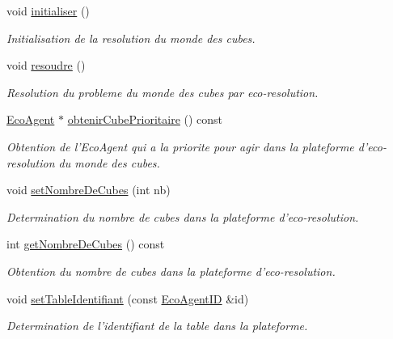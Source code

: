 \begin{CompactItemize}
\item 
void \hyperlink{classPlateformeMondeDesCubes_67160be6f5ecd0b8f3fffeb1a7bd81ba}{initialiser} ()
\begin{CompactList}\small\item\em Initialisation de la resolution du monde des cubes. \item\end{CompactList}\item 
void \hyperlink{classPlateformeMondeDesCubes_c7be18c8d02e2743e884545828cfabed}{resoudre} ()
\begin{CompactList}\small\item\em Resolution du probleme du monde des cubes par eco-resolution. \item\end{CompactList}\item 
\hyperlink{classEcoAgent}{EcoAgent} $\ast$ \hyperlink{classPlateformeMondeDesCubes_5f3ebe8acdfdbb447c13de8d3cbac438}{obtenirCubePrioritaire} () const 
\begin{CompactList}\small\item\em Obtention de l'EcoAgent qui a la priorite pour agir dans la plateforme d'eco-resolution du monde des cubes. \item\end{CompactList}\item 
void \hyperlink{classPlateformeMondeDesCubes_e519331088db520a76d1ead67a382c48}{setNombreDeCubes} (int nb)
\begin{CompactList}\small\item\em Determination du nombre de cubes dans la plateforme d'eco-resolution. \item\end{CompactList}\item 
int \hyperlink{classPlateformeMondeDesCubes_a341731830c30c695d5ef80c90377165}{getNombreDeCubes} () const 
\begin{CompactList}\small\item\em Obtention du nombre de cubes dans la plateforme d'eco-resolution. \item\end{CompactList}\item 
void \hyperlink{classPlateformeMondeDesCubes_cf6eccc70251d89c4d12c921f44934af}{setTableIdentifiant} (const \hyperlink{classEcoAgentID}{EcoAgentID} \&id)
\begin{CompactList}\small\item\em Determination de l'identifiant de la table dans la plateforme. \item\end{CompactList}\item 

\end{CompactItemize}
